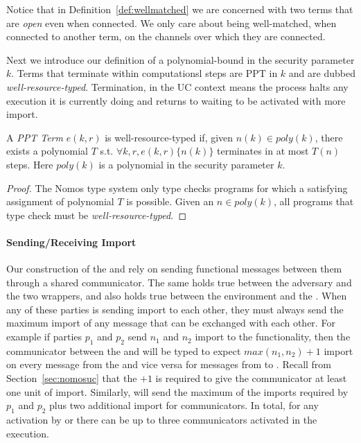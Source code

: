 Notice that in Definition~\ref{def:wellmatched} we are concerned with two terms that are \textit{open} even when connected. 
We only care about being well-matched, when connected to another term, on the channels over which they are connected.

Next we introduce our definition of a polynomial-bound in the security parameter $k$.
Terms that terminate within computationsl steps are PPT in $k$ and are dubbed \textit{well-resource-typed}.
Termination, in the UC context means the process halts any execution it is currently doing and returns to waiting to be activated with more import.
\begin{theorem}[PPT in $k$]\label{thm:ppt}
A \textit{PPT Term} $e(k, r)$ is well-resource-typed if, given $n(k) \in poly(k)$, there exists a polynomial $T$ s.t. $\forall k, r, e(k, r) \{n(k)\}$  terminates in at most $T(n)$ steps. Here $poly(k)$ is a polynomial in the security parameter $k$.
\end{theorem}

\begin{proof}
The Nomos type system only type checks programs for which a satisfying assignment of polynomial $T$ is possible.
Given an $n \in poly(k)$, all programs that type check must be \textit{well-resource-typed.}
\end{proof}

\paragraph{Sending/Receiving Import}
Our construction of the \partywrapper and \fwrapper rely on sending functional messages between them through a shared communicator.
The same holds true between the adversary and the two wrappers, and also holds true between the environment and the \partywrapper.
When any of these parties is sending import to each other, they must always send the maximum import of any message that can be exchanged with each other.
For example if parties $p_1$ and $p_2$ send $n_1$ and $n_2$ import to the functionality, then the communicator between the \partywrapper and \fwrapper will be typed to expect $max(n_1, n_2)+1$ import on every message from the \partywrapper and vice versa for messages from \fwrapper to \partywrapper. 
Recall from Section~\ref{sec:nomosuc} that the $+1$ is required to give the communicator at least one unit of import.
Similarly, \Z will send the maximum of the imports required by $p_1$ and $p_2$ plus two additional import for communicators.
In total, for any activation by \A or \Z there can be up to three communicators activated in the execution. 

